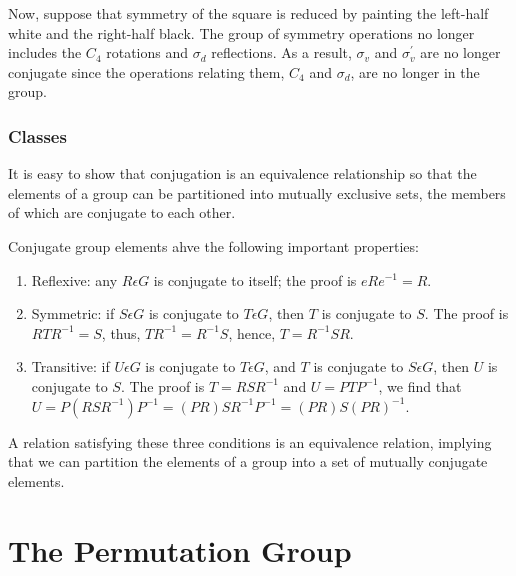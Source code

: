 Now, suppose that symmetry of the square is reduced by painting the
left-half white and the right-half black. The group of symmetry
operations no longer includes the $C_4$ rotations and $\sigma_d$
reflections.  As a result, $\sigma_v$ and $\sigma^{\prime}_v$ are no
longer conjugate since the operations relating them, $C_4$ and
$\sigma_d$, are no longer in the group.

\subsubsection{Classes}

It is easy to show that conjugation is an equivalence relationship so 
that the elements of a group can be partitioned into mutually 
exclusive sets, the members of which are conjugate to each other.

Conjugate group elements ahve the following important properties:

\begin{enumerate}
\item Reflexive: any $R \epsilon G$ is conjugate to itself; the 
proof is $eRe^{-1}=R$.
\item Symmetric: if $S \epsilon G$ is conjugate to $T \epsilon 
G$, then $T$ is conjugate to $S$.  The proof is $RTR^{-1}=S$, thus, 
$TR^{-1}=R^{-1}S$, hence, $T=R^{-1}SR$.
\item Transitive: if $U \epsilon G$ is conjugate to $T \epsilon 
G$, and $T$ is conjugate to $S \epsilon G$, then $U$ is conjugate to 
$S$.  The proof is $T = RSR^{-1}$ and $U = PTP^{-1}$, we find that 
$U = P(RSR^{-1})P^{-1}=(PR)SR^{-1}P^{-1}=(PR)S(PR)^{-1}$.
\end{enumerate}
A relation satisfying these three conditions is an equivalence 
relation, implying that we can partition the elements of a group into 
a set of mutually conjugate elements.

\section{The Permutation Group}

